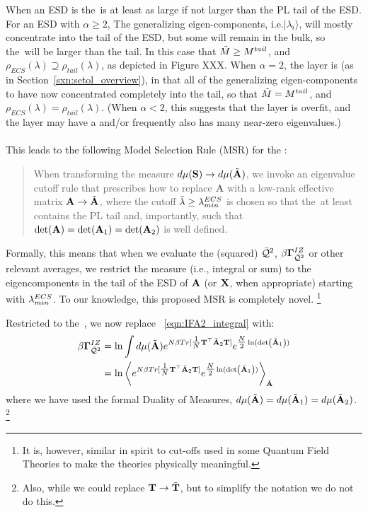 When an ESD is \emph{\FatTailed} the~\ECS is at least as large if not larger than the PL tail of the ESD.
For an ESD with $\alpha\ge 2$, The generalizing eigen-components, i.e.$|\lambda_{i}\rangle$, will mostly
concentrate into the tail of the ESD, but some will remain in the bulk, so
the~\ECS will be larger than the tail.
In this case that $\tilde{M}\ge M^{tail}$,
and
$\rho_{ECS}(\lambda)\supseteq\rho_{tail}(\lambda)$, as depicted in Figure XXX.
When $\alpha=2$,  the layer is \Ideal (as in Section~\ref{sxn:setol_overview}),
in that all of the generalizing eigen-components to have now concentrated completely into the tail, so that
 $\tilde{M}=M^{tail}$,
and
$\rho_{ECS}(\lambda)=\rho_{tail}(\lambda)$.
(When $\alpha< 2$, this suggests that the layer is overfit, and the layer may have a \CorrelationTrap and/or
frequently also has many near-zero eigenvalues.)
\\
\\
This leads to the following Model Selection Rule (MSR) for the \ECS:
\begin{quote}
  When transforming the measure $d\mu(\mathbf{S}) \rightarrow d\mu(\tilde{\mathbf{A}})$, we invoke an eigenvalue cutoff rule that
  prescribes how to replace $\mathbf{A}$ with a low-rank effective matrix $\mathbf{A}\rightarrow\tilde{\mathbf{A}}$,
  where the cutoff $\tilde{\lambda}\ge\lambda^{ECS}_{min}$ is chosen so that the~\ECS at least contains the PL tail
  and, importantly, such that $\det(\mathbf{A})=\det(\mathbf{A}_{1})=\det(\mathbf{A}_{2})$ is well defined.  
\end{quote}
Formally, this means that when we evaluate the \Quality (squared) $\bar{\mathcal{Q}}^{2}$, \GeneratingFunction $\beta\mathbf{\Gamma}^{IZ}_{\bar{\mathcal{Q}}^{2}}$
or other relevant averages, we restrict the measure (i.e., integral or sum) to the eigencomponents in the tail of the ESD of
$\mathbf{A}$ (or $\mathbf{X}$, when appropriate)
starting with $\lambda^{ECS}_{min}$.  
To our knowledge, this proposed MSR is completely novel.%
\footnote{It is, however, similar in spirit to cut-offs used in some Quantum Field Theories to make the theories physically meaningful.}

Restricted to the~\ECS, we now replace \EQN~\ref{eqn:IFA2_integral} with:
\begin{align}
  \nonumber 
  \beta\mathbf{\Gamma}^{IZ}_{\bar{\mathcal{Q}}^{2}} 
  &=
  \ln \int d\mu(\tilde{\mathbf{A}})
  e^{N\beta Tr[\tfrac{1}{N}{\mathbf{T}}^{\top}\tilde{\mathbf{A}}_{2}{\mathbf{T}}] }
  e^{\tfrac{N}{2}\ln(\mbox{}{\text{det}}\left(\tilde{\mathbf{A}}_{1}\right))} \\
  \label{eqn:IFA2_braket}
  & =
  \ln
  \left\langle
  e^{N\beta Tr[\tfrac{1}{N}{\mathbf{T}}^{\top}\tilde{\mathbf{A}}_{2}{\mathbf{T}}] }
  e^{\tfrac{N}{2}\ln(\mbox{}{\text{det}}\left(\tilde{\mathbf{A}}_{1}\right))}
    \right\rangle_{\tilde{\mathbf{A}}}
\end{align}
where we have used the formal Duality of Measures, $d\mu(\tilde{\mathbf{A}})=d\mu(\tilde{\mathbf{A}}_{1})=d\mu(\tilde{\mathbf{A}}_{2})$.
\footnote{Also, while we could replace ${\mathbf{T}}\rightarrow\tilde{\mathbf{T}}$, but to simplify the notation we do not do this.}


